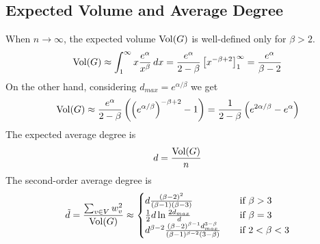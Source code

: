 \subsection{Expected Volume and Average Degree}

When $n\to\infty$, the expected volume $\operatorname*{Vol}(G)$ is well-defined only for $\beta>2$.
\begin{gather}
    \operatorname*{Vol}(G)\approx\int_1^{\infty}{x\frac{e^\alpha}{x^\beta}}\,dx
    =\frac{e^\alpha}{2-\beta}\left[ x^{-\beta+2} \right]_1^\infty
    =\frac{e^\alpha}{\beta-2}
\end{gather}
On the other hand, considering $d_{max}=e^{\alpha/\beta}$ we get
\begin{equation}
    \label{eq:powerlaw-coin-toss-vol}
    \operatorname*{Vol}(G)\approx\frac{e^\alpha}{2-\beta}\left(\left(e^{\alpha/\beta}\right)^{-\beta+2}-1\right)
    =\frac{1}{2-\beta}\left(e^{2\alpha/\beta}-e^\alpha\right)
\end{equation}
The expected average degree is
\begin{equation}
    d=\frac{\operatorname*{Vol}(G)}{n}
\end{equation}
The second-order average degree is
\begin{equation}
    \tilde{d}=\frac{\sum_{v\in V}{w_v^2}}{\operatorname*{Vol}(G)}\approx
    \begin{cases}
        d\frac{(\beta-2)^2}{(\beta-1)(\beta-3)} & \quad \text{if } \beta>3\\
        \frac{1}{2}d\ln \frac{2d_{max}}{d} & \quad \text{if } \beta=3\\
        d^{\beta-2}\frac{(\beta-2)^{\beta-1}d_{max}^{3-\beta}}{(\beta-1)^{\beta-2}(3-\beta)} & \quad \text{if } 2<\beta<3
    \end{cases}
\end{equation}

%
%
%
%
%
%
%
%

